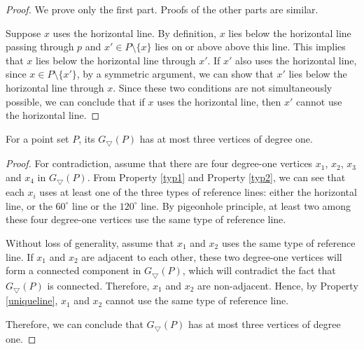 \begin{proof}
We prove only the first part. Proofs of the other parts are similar. 

Suppose $x$ uses the horizontal line. By definition, $x$ lies below the horizontal line passing through $p$ and $x' \in P\setminus \{ x\}$ 
lies on or above above this line. This implies that $x$ lies below the horizontal line through $x'$. If $x'$ also uses the horizontal line, 
since $x \in P \setminus \{x'\}$, by a symmetric argument, we can show that $x'$ lies below the horizontal line through $x$. Since these 
two conditions are not simultaneously possible, we can conclude that if $x$ uses the horizontal line, then $x'$ cannot use the horizontal line. 
\end{proof}
\begin{lemma} \label{degreeone}
For a point set $P$, its $G_\bigtriangledown(P)$ has at most three vertices 
of degree one.
\end{lemma}
\begin{proof}
For contradiction, assume that there are four degree-one vertices $x_1$, $x_2$, $x_3$ and $x_4$ in $G_\bigtriangledown(P)$. From Property \ref{typ1} 
and Property \ref{typ2}, we can see that each $x_i$ uses at least one of the three types of reference lines: either the horizontal line, or the 
$60^\circ$ line or 
the $120^\circ$ line. By pigeonhole principle, at least two among these four degree-one vertices use the same type of reference line. 

Without loss of generality, assume that $x_1$ and $x_2$ uses the same type of reference line. 
If $x_1$ and $x_2$ are adjacent to each other, these two degree-one vertices will form a connected component in $G_\bigtriangledown(P)$, which will 
contradict the fact that $G_\bigtriangledown(P)$ is connected. Therefore, $x_1$ and $x_2$ are non-adjacent. Hence, by Property \ref{uniqueline}, 
$x_1$ and $x_2$ cannot use the same type of reference line. 

Therefore, we can conclude that $G_\bigtriangledown(P)$ has at most three vertices 
of degree one.
\end{proof}

